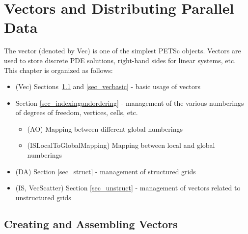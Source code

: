 %
%

\chapter{Vectors and Distributing Parallel Data} 
\label{chapter_vectors}

The vector (denoted by Vec) is one of the simplest PETSc
objects.  Vectors are used to store discrete PDE solutions, right-hand
sides for linear systems, etc. This chapter is organized as follows:

\begin{itemize}
\item (Vec) Sections~\ref{sec_veccreate} and \ref{sec_vecbasic} - basic usage of vectors
\item Section \ref{sec_indexingandordering} - management of the various numberings of
               degrees of freedom, vertices, cells, etc.
  \begin{itemize} 
  \item (AO) Mapping between different global numberings
  \item (ISLocalToGlobalMapping) Mapping between local and global numberings
  \end{itemize}
\item (DA) Section \ref{sec_struct} - management of structured grids
\item (IS, VecScatter) Section \ref{sec_unstruct} - management of vectors related to 
      unstructured grids
\end{itemize}

\section{Creating and Assembling Vectors}
\label{sec_veccreate}

